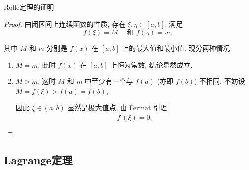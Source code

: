\documentclass[
10pt,
aspectratio=43,
]{beamer}
\begin{document}
\begin{frame}{Rolle定理的证明}
	\begin{proof}
		由闭区间上连续函数的性质, 存在 $\xi, \eta \in[a, b]$, 满足
		$$
			f(\xi)=M \quad \text { 和 } f(\eta)=m,
		$$

		其中 $M$ 和 $m$ 分别是 $f(x)$ 在 $[a, b]$ 上的最大值和最小值. 现分两种情况:
		\begin{enumerate}
			\item $M=m$. 此时 $f(x)$ 在 $[a, b]$ 上恒为常数, 结论显然成立.
			\item $M>m$. 这时 $M$ 和 $m$ 中至少有一个与 $f(a)$ (亦即 $f(b))$ 不相同, 不妨设 $M=f(\xi)>f(a)=f(b)$,

			      因此 $\xi \in(a, b)$ 显然是极大值点, 由 Fermat 引理
			      $$
				      f^{\prime}(\xi)=0 .
			      $$
		\end{enumerate}
	\end{proof}
\end{frame}

\subsection{Lagrange定理}
\end{document}

